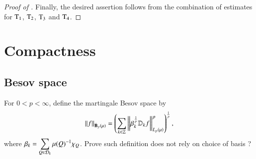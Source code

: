 \documentclass[leqno]{amsart}
\begin{document}
\begin{proof}[Proof of ]
Finally, the desired assertion follows from the combination of estimates for ${\rm T}_{1}$, ${\rm T}_{2}$, ${\rm T}_{3}$ and ${\rm T}_{4}$.  
\end{proof}




\section{Compactness}
%

\subsection{Besov space}
For $0<p<\infty$, define the martingale Besov space by
\begin{align*}
\left\| f \right\|_{\dot{\mathbf B}_{p}(\mu)}=
\left(\sum_{k\in{\mathbb Z}}\left\| \beta_{k}^{\frac{1}{p}}\mathbb{D}_{k}f \right\|_{L_{p}(\mu)}^{p}\right)^{\frac{1}{p}},
\end{align*}
where $\displaystyle\beta_{k}=\sum_{Q\in{\mathcal D}_{k}}\mu(Q)^{-1}\chi_{Q}$. 
{\color{red}Prove such definition does not rely on choice of basis ?}
\end{document}
